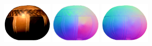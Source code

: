     \\
    \\
    \includegraphics[width=0.19\textwidth]{ch-psfcn/images/Results/Gourd/2.0_gourd2_I_0003.png}
    \includegraphics[width=0.19\textwidth]{ch-psfcn/images/Results/LightStage/L2/gourd2_Normal_l2_4.0.jpg}
    \includegraphics[width=0.19\textwidth]{ch-psfcn/images/Results/LightStage/PS-FCN_normalize/gourd2_Normal_DiLiGenT.jpg}
    \\
